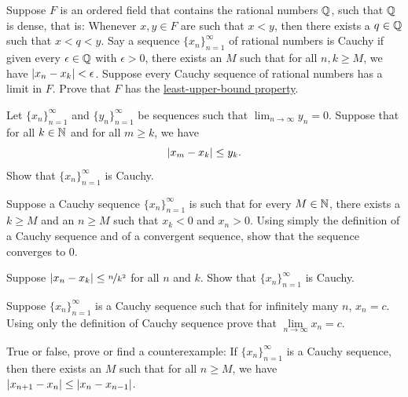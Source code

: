 \begin{exercise}[Challenging]
Suppose $F$ is an ordered field that contains the rational numbers
${\mathbb{Q}}$, such that ${\mathbb{Q}}$ is dense,
that is: Whenever $x,y \in F$ are such that $x < y$,
then there exists a $q \in {\mathbb{Q}}$ such that $x < q < y$.
Say a sequence $\{ x_n \}_{n=1}^\infty$ of rational numbers is Cauchy
if given every $\epsilon \in {\mathbb{Q}}$ with $\epsilon > 0$, there exists
an $M$ such that for all $n,k \geq M$, we have $\left\lvert {x_n-x_k} \right\rvert < \epsilon$.
Suppose every Cauchy sequence of rational numbers has a limit in $F$.
Prove that $F$ has the \hyperref[defn:lub]{least-upper-bound property}.
\end{exercise}

\begin{exercise}
Let $\{ x_n \}_{n=1}^\infty$ and $\{ y_n \}_{n=1}^\infty$ be sequences such
that $\lim_{n\to\infty} y_n =0$.  Suppose that for all $k \in {\mathbb{N}}$
and
for all $m \geq k$, we have
\begin{equation*}
\left\lvert {x_m-x_k} \right\rvert \leq y_k .
\end{equation*}
Show that $\{ x_n \}_{n=1}^\infty$ is Cauchy.
\end{exercise}

\begin{exercise}
Suppose a Cauchy sequence $\{ x_n \}_{n=1}^\infty$ is such that for every $M \in {\mathbb{N}}$,
there exists a $k \geq M$ and an $n \geq M$ such that
$x_k < 0$ and $x_n > 0$.  Using simply the definition of a Cauchy sequence
and of a convergent sequence, show that
the sequence converges to $0$.
\end{exercise}

\begin{exercise}
Suppose $\left\lvert {x_n-x_k} \right\rvert \leq \nicefrac{n}{k^2}$ for all $n$ and $k$.
Show that $\{ x_n \}_{n=1}^\infty$ is Cauchy.
\end{exercise}

\begin{exercise}
Suppose $\{ x_n \}_{n=1}^\infty$ is a Cauchy sequence such that for infinitely many
$n$, $x_n = c$.  Using only the definition of Cauchy sequence prove 
that $\lim\limits_{n\to\infty} x_n = c$.
\end{exercise}

\begin{exercise}
True or false, prove or find a counterexample:  If $\{ x_n \}_{n=1}^\infty$ is a Cauchy
sequence, then there exists an $M$
such that for all $n \geq M$, we have
$\left\lvert {x_{n+1}-x_n} \right\rvert
\leq
\left\lvert {x_{n}-x_{n-1}} \right\rvert$.
\end{exercise}


